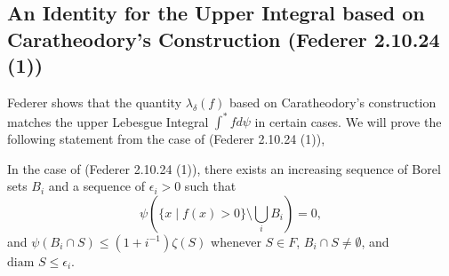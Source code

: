 \subsection{An Identity for the Upper Integral based on Caratheodory's Construction (Federer 2.10.24 (1))} 
Federer shows that the quantity \(\lambda_\delta(f)\) based on Caratheodory's construction matches the upper
Lebesgue Integral \(\int^* f d\psi\) in certain cases. We will prove the following
statement from the case of (Federer 2.10.24 (1)),
\begin{proposition}
In the case of (Federer 2.10.24 (1)), there exists an increasing sequence of
Borel sets \(B_i\) and a sequence of \(\epsilon_i > 0\) such that
\begin{equation}
\psi\left(\{x \mid f(x) > 0 \} \setminus \bigcup_i B_i \right) = 0,
\end{equation}
and \(\psi(B_i \cap S) \leq (1 + i^{-1}) \zeta(S)\) whenever \(S \in F\), \(B_i \cap S \neq \emptyset\),
and \(\text{diam }S \leq \epsilon_i\).
\end{proposition}

